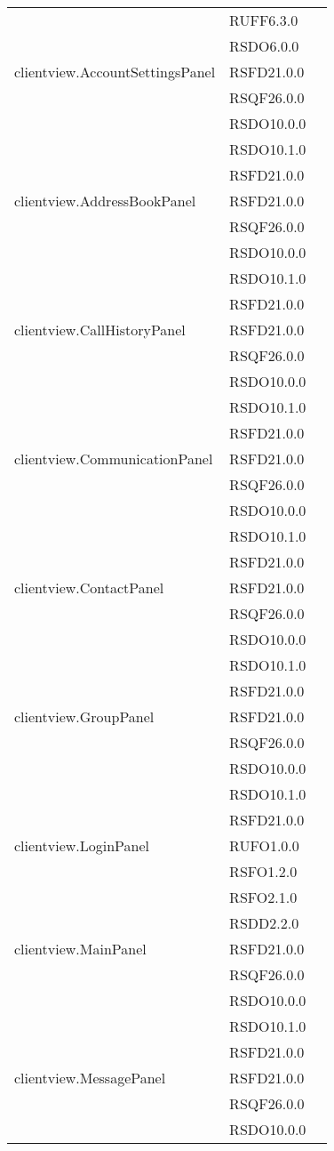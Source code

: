 \begin{center}
\begin{longtable}{lp{}l}
& RUFF6.3.0\\
& RSDO6.0.0\\
clientview.AccountSettingsPanel & RSFD21.0.0\\
& RSQF26.0.0\\
& RSDO10.0.0\\
& RSDO10.1.0\\
& RSFD21.0.0\\
clientview.AddressBookPanel & RSFD21.0.0\\
& RSQF26.0.0\\
& RSDO10.0.0\\
& RSDO10.1.0\\
& RSFD21.0.0\\
clientview.CallHistoryPanel & RSFD21.0.0\\
& RSQF26.0.0\\
& RSDO10.0.0\\
& RSDO10.1.0\\
& RSFD21.0.0\\
clientview.CommunicationPanel & RSFD21.0.0\\
& RSQF26.0.0\\
& RSDO10.0.0\\
& RSDO10.1.0\\
& RSFD21.0.0\\
clientview.ContactPanel & RSFD21.0.0\\
& RSQF26.0.0\\
& RSDO10.0.0\\
& RSDO10.1.0\\
& RSFD21.0.0\\
clientview.GroupPanel & RSFD21.0.0\\
& RSQF26.0.0\\
& RSDO10.0.0\\
& RSDO10.1.0\\
& RSFD21.0.0\\
clientview.LoginPanel & RUFO1.0.0\\
& RSFO1.2.0\\
& RSFO2.1.0\\
& RSDD2.2.0\\
clientview.MainPanel & RSFD21.0.0\\
& RSQF26.0.0\\
& RSDO10.0.0\\
& RSDO10.1.0\\
& RSFD21.0.0\\
clientview.MessagePanel & RSFD21.0.0\\
& RSQF26.0.0\\
& RSDO10.0.0\\

\end{longtable}
\end{center}
